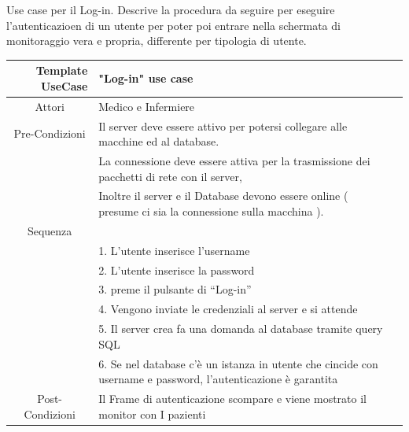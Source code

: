 \documentclass{article}
\begin{document}
Use case per il Log-in. Descrive la procedura da seguire per eseguire l'autenticazioen di un utente per poter poi entrare nella schermata di monitoraggio vera e propria, differente per tipologia di utente. 

\vspace{1cm}

\begin{center}

	\begin{tabular}{r@{\vspace{0.4cm}}ll}
	

	\hline
	
	\textbf{Template UseCase} & \textbf{          "Log-in" use case } \\

	\hline
	
	\multicolumn{1}{c}{Attori}  & Medico e Infermiere \\

	\cline{1-1}
\hline

	\multicolumn{1}{c}{Pre-Condizioni}  & Il server deve essere attivo per potersi collegare alle macchine ed al database.\\ \cline{1-1}&

La connessione deve essere attiva per la trasmissione dei pacchetti di rete con il server, \\&
Inoltre il server e il Database devono essere online ( presume ci sia la connessione sulla macchina ).\\

\hline
	\multicolumn{1}{c}{Sequenza}    \\ \cline{1-1}&
 1. L’utente inserisce l’username \\&
    2. L’utente inserisce la password \\&
    3. preme il pulsante di “Log-in”\\&
    4. Vengono inviate le credenziali al server e si attende  \\&
	    5. Il server crea fa una domanda al database tramite query SQL \\&
    6. Se nel database c’è un istanza in utente che cincide con username e password, l’autenticazione è garantita \\

\hline
	
\multicolumn{1}{c}{Post-Condizioni}  & Il Frame di autenticazione scompare e viene mostrato il monitor con I pazienti \\ \cline{1-1}
\hline


\end{tabular}
\end{center}
\end{document}
